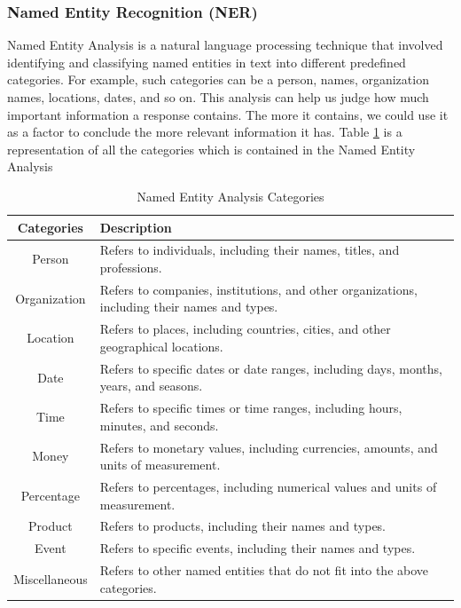 \documentclass[50pt]{usiinfbachelorproject}
\begin{document}
\subsubsection{Named Entity Recognition (NER)}
Named Entity Analysis \cite{mikheev1999named} is a natural language processing technique that involved identifying and classifying named entities in text into different predefined categories. For example, such categories can be a person, names, organization names, locations, dates, and so on. This analysis can help us judge how much important information a response contains. The more it contains, we could use it as a factor to conclude the more relevant information it has. Table \ref{tab:entity_categories} is a representation of all the categories which is contained in the Named Entity Analysis

  

\begin{table}[H]
  \centering
  \begin{tabular}{|c|l|}
    \hline
    Categories & Description \\
    \hline
    \hline
    Person & Refers to individuals, including their names, titles, and professions. \\
    \hline
    Organization & Refers to companies, institutions, and other organizations, including their names and types. \\
    \hline
    Location & Refers to places, including countries, cities, and other geographical locations. \\
    \hline
    Date & Refers to specific dates or date ranges, including days, months, years, and seasons. \\
    \hline
    Time & Refers to specific times or time ranges, including hours, minutes, and seconds. \\
    \hline
    Money & Refers to monetary values, including currencies, amounts, and units of measurement. \\
    \hline
    Percentage & Refers to percentages, including numerical values and units of measurement. \\
    \hline
    Product & Refers to products, including their names and types. \\
    \hline
    Event & Refers to specific events, including their names and types. \\
    \hline
    Miscellaneous & Refers to other named entities that do not fit into the above categories. \\
    \hline
  \end{tabular}
  \caption{Named Entity Analysis Categories}
  \label{tab:entity_categories}
\end{table}
\end{document}
